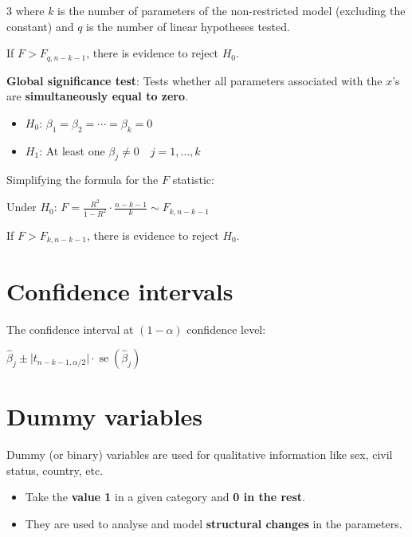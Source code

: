 \documentclass[10pt, a4paper, landscape]{article}
\DeclareMathOperator{\se}{se}
\begin{document}
\begin{multicols}{3}
where \( k \) is the number of parameters of the non-restricted model (excluding the constant) and \( q \) is the number of linear hypotheses tested.

If \( F > F_{q, n - k - 1} \), there is evidence to reject \( H_{0} \).

\textbf{Global significance test}: Tests whether all parameters associated with the \( x \)'s are \textbf{simultaneously equal to zero}.

\begin{itemize}[leftmargin=*]
	\item \( H_{0}\): \( \beta_{1} = \beta_{2} = \cdots = \beta_{k} = 0 \)
	\item \( H_{1}\): At least one \( \beta_{j} \neq 0 \quad j = 1, \ldots, k \)
\end{itemize}

Simplifying the formula for the \( F \) statistic:

\begin{center}
	Under \( H_{0} \): \quad \( F = \frac{R^{2}}{1 - R^{2}} \cdot \frac{n - k - 1}{k} \sim F_{k, n - k - 1} \)
\end{center}

If \( F > F_{k, n - k - 1} \), there is evidence to reject \( H_{0} \).

\section*{Confidence intervals}

The confidence interval at \( (1 - \alpha) \) confidence level:

\begin{center}
	\( \hat{\beta}_{j} \pm \lvert t_{n - k - 1, \alpha / 2} \rvert \cdot \se(\hat{\beta}_{j}) \)
\end{center}

\columnbreak

\section*{Dummy variables}

Dummy (or binary) variables are used for qualitative information like sex, civil status, country, etc.

\begin{itemize}[leftmargin=*]
	\item Take the \textbf{value 1} in a given category and \textbf{0 in the rest}.
	\item They are used to analyse and model \textbf{structural changes} in the parameters.
\end{itemize}


\end{multicols}
\end{document}
